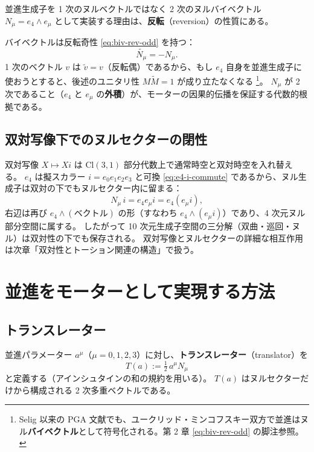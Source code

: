 \documentclass[dvipdfmx,a4paper,oneside]{jsbook}
\numberwithin{equation}{chapter}
\begin{document}
並進生成子を 1 次のヌルベクトルではなく 2 次のヌルバイベクトル \(N_\mu = e_4 \wedge e_\mu\) として実装する理由は、\textbf{反転}（reversion）の性質にある。

バイベクトルは反転奇性 \eqref{eq:biv-rev-odd} を持つ：
\begin{equation}
  \widetilde{N_\mu} = -N_\mu.
  \label{eq:null-rev-odd}
\end{equation}
1 次のベクトル \(v\) は \(\widetilde{v} = v\)（反転偶）であるから、もし \(e_4\) 自身を並進生成子に使おうとすると、後述のユニタリ性 \(M\widetilde{M} = 1\) が成り立たなくなる \footnote{Selig 以来の PGA 文献でも、ユークリッド・ミンコフスキー双方で並進はヌル\textbf{バイベクトル}として符号化される。第 2 章 \eqref{eq:biv-rev-odd} の脚注参照。}。
\(N_\mu\) が 2 次であること（\(e_4\) と \(e_\mu\) の\textbf{外積}）が、モーターの因果的伝播を保証する代数的根拠である。

\subsection{双対写像下でのヌルセクターの閉性}

双対写像 \(X \mapsto Xi\) は \(\mathrm{Cl}(3,1)\) 部分代数上で通常時空と双対時空を入れ替える。
\(e_4\) は擬スカラー \(i = e_0 e_1 e_2 e_3\) と可換 \eqref{eq:e4-i-commute} であるから、ヌル生成子は双対の下でもヌルセクター内に留まる：
\begin{equation}
  N_\mu\, i = e_4 e_\mu i = e_4 (e_\mu i),
\end{equation}
右辺は再び \(e_4 \wedge (\text{ベクトル})\) の形（すなわち \(e_4 \wedge (e_\mu i)\)）であり、4 次元ヌル部分空間に属する。
したがって 10 次元生成子空間の三分解（双曲・巡回・ヌル）は双対性の下でも保存される。
双対写像とヌルセクターの詳細な相互作用は次章「双対性とトーション関連の構造」で扱う。

\section{並進をモーターとして実現する方法}

\subsection{トランスレーター}

並進パラメーター \(a^\mu\)（\(\mu = 0,1,2,3\)）に対し、\textbf{トランスレーター}（translator）を
\begin{equation}
  T(a) := \tfrac{1}{2}\, a^\mu N_\mu
  \label{eq:translator}
\end{equation}
と定義する（アインシュタインの和の規約を用いる）。
\(T(a)\) はヌルセクターだけから構成される 2 次多重ベクトルである。
\end{document}

